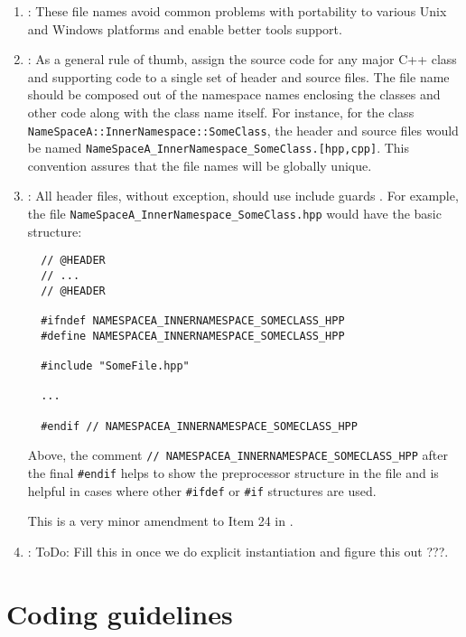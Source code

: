 \begin{enumerate}

{}\item\NOSFFileExtension: These file names avoid common
problems with portability to various Unix and Windows platforms and enable
better tools support.

{}\item\NOSFClassFiles: As a general rule of thumb, assign the source code for any
major C++ class and supporting code to a single set of header and source
files.  The file name should be composed out of the namespace names enclosing
the classes and other code along with the class name itself.  For instance,
for the class {}\texttt{NameSpaceA\-::InnerNamespace\-::SomeClass}, the header
and source files would be named
{}\texttt{NameSpaceA\-\_InnerNamespace\-\_SomeClass.[hpp,cpp]}.  This
convention assures that the file names will be globally unique.

{}\item\NOSFIncludeGuards: All header files, without exception, should use include
guards {}\cite[Item 24]{C++CodingStandards05}.  For example, the file
{}\texttt{NameSpaceA\-\_InnerNamespace\-\_SomeClass.hpp} would have the basic
structure:

{\small\begin{verbatim}
  // @HEADER
  // ...
  // @HEADER

  #ifndef NAMESPACEA_INNERNAMESPACE_SOMECLASS_HPP
  #define NAMESPACEA_INNERNAMESPACE_SOMECLASS_HPP

  #include "SomeFile.hpp"

  ...

  #endif // NAMESPACEA_INNERNAMESPACE_SOMECLASS_HPP
\end{verbatim}}

Above, the comment {}\texttt{//
NAMESPACEA\-\_INNERNAMESPACE\-\_SOMECLASS\-\_HPP} after the final
{}\texttt{\#endif} helps to show the preprocessor structure in the file and is
helpful in cases where other {}\texttt{\#ifdef} or {}\texttt{\#if} structures
are used.

This is a very minor amendment to Item 24 in {}\cite{C++CodingStandards05}.

{}\item\NOSFTemplateFiles: ToDo: Fill this in once we do explicit instantiation and
figure this out ???.

\end{enumerate}

%
\section{Coding guidelines}
\label{thyracodingguidelines:codingguidelines:sec}
%


